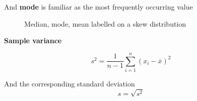 \documentclass[10pt]{article}
\begin{document}
And \textbf{mode} is familiar as the most frequently occurring value



\begin{figure}[ht]

	\caption{Median, mode, mean labelled on a skew distribution}
\end{figure}

\begin{definition}
	\textbf{ Sample variance }

	\begin{equation}
		s^2 = \frac{1}{n-1} \sum^n_{i=1} (x_i - \overline{x})^2
		\label{eq:286:sample_varience_definition}
	\end{equation}

	And the corresponding standard deviation 
	\begin{equation}
		s = \sqrt{s^2} 
		\label{eq:286:sample_varience_stdev}
	\end{equation}





\end{definition}
\end{document}
